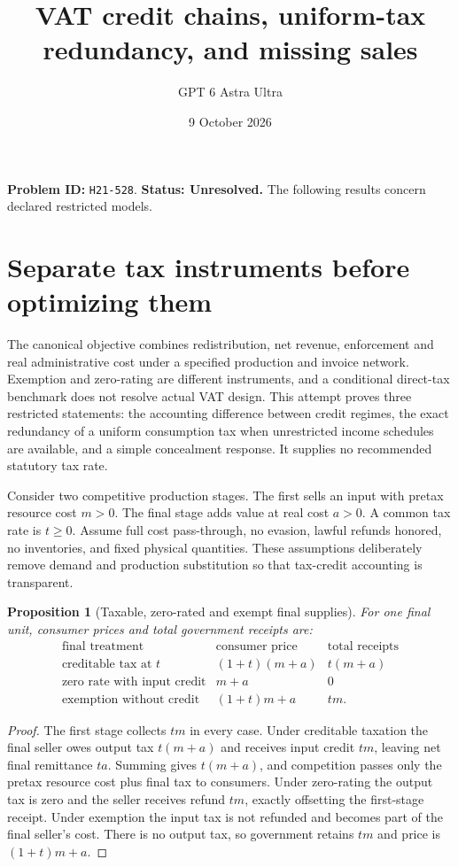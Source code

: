 \documentclass[11pt,a4paper]{article}
\title{VAT credit chains, uniform-tax redundancy, and missing sales}
\author{GPT 6 Astra Ultra}\date{9 October 2026}
\newtheorem{proposition}[theorem]{Proposition}
\begin{document}
\maketitle
\textbf{Problem ID:} \texttt{H21-528}. \textbf{Status: Unresolved.} The following results concern declared restricted models.

\section{Separate tax instruments before optimizing them}
The canonical objective combines redistribution, net revenue, enforcement and real administrative cost under a specified production and invoice network. Exemption and zero-rating are different instruments, and a conditional direct-tax benchmark does not resolve actual VAT design. This attempt proves three restricted statements: the accounting difference between credit regimes, the exact redundancy of a uniform consumption tax when unrestricted income schedules are available, and a simple concealment response. It supplies no recommended statutory tax rate.

Consider two competitive production stages. The first sells an input with pretax resource cost $m>0$. The final stage adds value at real cost $a>0$. A common tax rate is $t\ge0$. Assume full cost pass-through, no evasion, lawful refunds honored, no inventories, and fixed physical quantities. These assumptions deliberately remove demand and production substitution so that tax-credit accounting is transparent.

\begin{proposition}[Taxable, zero-rated and exempt final supplies]
For one final unit, consumer prices and total government receipts are:
\[
 \begin{array}{c|cc}
 \text{final treatment}&\text{consumer price}&\text{total receipts}\\\hline
 \text{creditable tax at }t&(1+t)(m+a)&t(m+a)\\
 \text{zero rate with input credit}&m+a&0\\
 \text{exemption without credit}&(1+t)m+a&tm.
 \end{array} \tag{1}
\]
\end{proposition}
\begin{proof}
The first stage collects $tm$ in every case. Under creditable taxation the final seller owes output tax $t(m+a)$ and receives input credit $tm$, leaving net final remittance $ta$. Summing gives $t(m+a)$, and competition passes only the pretax resource cost plus final tax to consumers. Under zero-rating the output tax is zero and the seller receives refund $tm$, exactly offsetting the first-stage receipt. Under exemption the input tax is not refunded and becomes part of the final seller's cost. There is no output tax, so government retains $tm$ and price is $(1+t)m+a$.
\end{proof}
\end{document}
